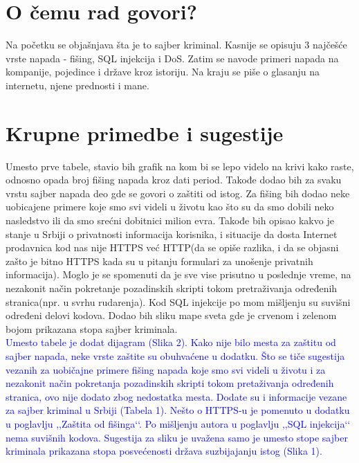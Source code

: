 \documentclass[a4paper]{report}
\newcommand{\odgovor}[1]{\textcolor{blue}{#1}}
\begin{document}
\section{O čemu rad govori?}
Na početku se objašnjava šta je to sajber kriminal. Kasnije se opisuju 3 najčešće vrste napada - fišing, SQL injekcija i DoS. Zatim se navode primeri napada na kompanije, pojedince i države kroz istoriju. Na kraju se piše o glasanju na internetu, njene prednosti i mane.

\section{Krupne primedbe i sugestije}

Umesto prve tabele, stavio bih grafik na kom bi se lepo videlo na krivi kako raste, odnosno opada broj fišing napada kroz dati period. Takođe dodao bih za svaku vrstu sajber napada deo gde se govori o zaštiti od istog. Za fišing bih dodao neke uobicajene primere koje smo svi videli u životu kao što su da smo dobili neko nasledstvo ili da smo srećni dobitnici milion evra. Takođe bih opisao kakvo je stanje u Srbiji o privatnosti informacija korisnika, i situacije da dosta Internet prodavnica kod nas nije HTTPS već HTTP(da se opiše razlika, i da se objasni zašto je bitno HTTPS kada su u pitanju formulari za unošenje privatnih informacija). Moglo je se spomenuti da je sve vise prisutno u poslednje vreme, na nezakonit način pokretanje pozadinskih skripti tokom pretraživanja određenih stranica(npr. u svrhu rudarenja). Kod SQL injekcije po mom mišljenju su suvišni određeni delovi kodova. Dodao bih sliku mape sveta gde je crvenom i zelenom bojom prikazana stopa sajber kriminala.\\
\odgovor{Umesto tabele je dodat dijagram (Slika 2). Kako nije bilo mesta za zaštitu od sajber napada, neke vrste zaštite su obuhvaćene u dodatku. Što se tiče sugestija vezanih za uobičajne primere fišing napada koje smo svi videli u životu i za nezakonit način pokretanja pozadinskih skripti tokom pretaživanja određenih stranica, ovo nije dodato zbog nedostatka mesta. Dodate su i informacije vezane za sajber kriminal u Srbiji (Tabela 1). Nešto o HTTPS-u je pomenuto u dodatku u poglavlju ,,Zaštita od fišinga‘‘. Po mišljenju autora u poglavlju ,,SQL injekcija‘‘ nema suvišnih kodova. Sugestija za sliku je uvažena samo je umesto stope sajber kriminala prikazana stopa posvećenosti država suzbijajanju istog (Slika 1).}
\end{document}
